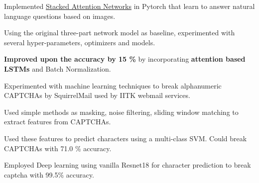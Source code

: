 \documentclass[a4paper]{norm-resume}
\begin{document}
\vspace{5mm}

  
\begin{tightitemize}
        \small{
        \item Implemented \href{https://arxiv.org/abs/1511.02274}{Stacked Attention Networks} in Pytorch that learn to answer natural language questions based on images.
        \item Using the original three-part network model as baseline, experimented with several hyper-parameters, optimizers and models.
        \item \textbf{Improved upon the accuracy by 15 \%} by incorporating \textbf{attention based LSTMs} and Batch Normalization.
        }
\end{tightitemize}

\vspace{5mm}

 
\begin{tightitemize}
        \small{
        \item Experimented with machine learning techniques to break alphanumeric CAPTCHAs by SquirrelMail used by IITK webmail services. %
        \item Used simple methods as masking, noise filtering, sliding window matching to extract features from CAPTCHAs.
        \item Used these features to predict characters using a multi-class SVM. Could break CAPTCHAs with 71.0 \% accuracy.
        \item Employed Deep learning using vanilla Resnet18 for character prediction to break captcha with 99.5\% accuracy.
        }
\end{tightitemize}

\vspace{5mm}
\end{document}
